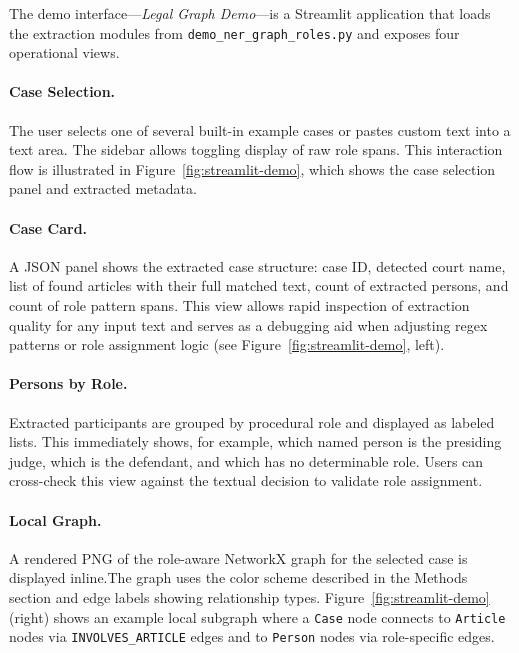 \documentclass[11pt]{article}
\begin{document}
The demo interface---\emph{Legal Graph Demo}---is a Streamlit application that loads the extraction modules from \texttt{demo\_ner\_graph\_roles.py} and exposes four operational views.

\paragraph{Case Selection.}

The user selects one of several built-in example cases or pastes custom text into a text area. The sidebar allows toggling display of raw role spans. This interaction flow is illustrated in Figure~\ref{fig:streamlit-demo}, which shows the case selection panel and extracted metadata.

\paragraph{Case Card.}

A JSON panel shows the extracted case structure: case ID, detected court name, list of found articles with their full matched text, count of extracted persons, and count of role pattern spans. This view allows rapid inspection of extraction quality for any input text and serves as a debugging aid when adjusting regex patterns or role assignment logic (see Figure~\ref{fig:streamlit-demo}, left).

\paragraph{Persons by Role.}

Extracted participants are grouped by procedural role and displayed as labeled lists. This immediately shows, for example, which named person is the presiding judge, which is the defendant, and which has no determinable role. Users can cross-check this view against the textual decision to validate role assignment.

\paragraph{Local Graph.}

A rendered PNG of the role-aware NetworkX graph for the selected case is displayed inline.The graph uses the color scheme described in the Methods section and edge labels showing relationship types. Figure~\ref{fig:streamlit-demo} (right) shows an example local subgraph where a \texttt{Case} node connects to \texttt{Article} nodes via \texttt{INVOLVES\_ARTICLE} edges and to \texttt{Person} nodes via role-specific edges.
\end{document}
